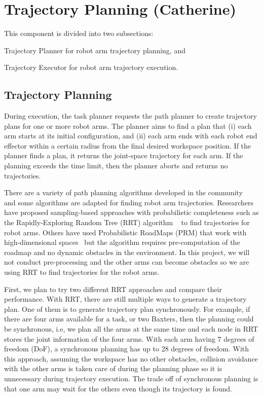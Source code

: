 \section{Trajectory Planning (Catherine)}

This component is divided into two subsections:
\begin{enumerate*}[label=\thesection.\arabic*]
\item Trajectory Planner for robot arm trajectory planning, and
\item Trajectory Executor for robot arm trajectory execution.
\end{enumerate*}

\subsection{Trajectory Planning}

During execution, the task planner requests the path planner to create trajectory plans for one or more robot arms. The planner aims to find a plan that (i) each arm starts at its initial configuration, and (ii) each arm ends with each robot end effector within a certain radius from the final desired workspace position. If the planner finds a plan, it returns the joint-space trajectory for each arm. If the planning exceeds the time limit, then the planner aborts and returns no trajectories. 

There are a variety of path planning algorithms developed in the community~\cite{DBLP:books/daglib/0016830} and some algorithms are adapted for finding robot arm trajectories. 
Researchers have proposed sampling-based approaches with probabilistic completeness such as the Rapidly-Exploring Random Tree (RRT) algorithm ~\cite{VahrenkampBAKD09} to find trajectories for robot arms. Others have used Probabilistic RoadMaps (PRM) that work with high-dimensional spaces~\cite{KavrakiSLO96} but the algorithm requires pre-computation of the roadmap and no dynamic obstacles in the environment. In this project, we will not conduct pre-processing and the other arms can become obstacles so we are using RRT to find trajectories for the robot arms.

First, we plan to try two different RRT approaches and compare their performance. With RRT, there are still multiple ways to generate a trajectory plan.
One of them is to generate trajectory plan synchronously.
For example, if there are four arms available for a task, or two Baxters, then the planning could be synchronous, i.e, we plan all the arms at the same time and each node in RRT stores the joint information of the four arms. With each arm having 7 degrees of freedom (DoF), a synchronous planning has up to 28 degrees of freedom.
With this approach, assuming the workspace has no other obstacles, collision avoidance with the other arms is taken care of during the planning phase so it is unnecessary during trajectory execution.  
The trade off of synchronous planning is that one arm may wait for the others even though its trajectory is found.

